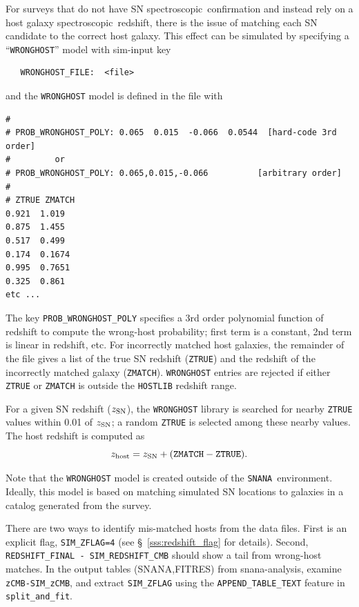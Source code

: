 \documentclass[12pt]{article}
\newcommand{\snana}{{\tt SNANA}}
\newcommand{\spec}{spectroscopic}
\begin{document}
{For surveys that do not have SN \spec\ confirmation and instead
rely on a host galaxy \spec\ redshift, there is the issue of
matching each SN candidate to the correct host galaxy. 
This effect can be simulated by specifying a ``{\tt WRONGHOST}'' 
model with sim-input key 
%
\begin{verbatim}
   WRONGHOST_FILE:  <file> 
\end{verbatim}
%
and the {\tt WRONGHOST}  model is defined in the file with
%
\begin{Verbatim}[frame=single]
#
# PROB_WRONGHOST_POLY: 0.065  0.015  -0.066  0.0544  [hard-code 3rd order]
#         or
# PROB_WRONGHOST_POLY: 0.065,0.015,-0.066          [arbitrary order]
#
# ZTRUE ZMATCH 
0.921  1.019
0.875  1.455
0.517  0.499
0.174  0.1674
0.995  0.7651
0.325  0.861 
etc ...
\end{Verbatim}
%
The key {\tt PROB\_WRONGHOST\_POLY} specifies a 3rd order
polynomial function of redshift to compute the wrong-host
probability; first term is a constant, 2nd term is linear in redshift, etc.
For incorrectly matched host galaxies, the remainder of the file 
gives a list of the true SN redshift
({\tt ZTRUE}) and the redshift of the incorrectly matched
galaxy ({\tt ZMATCH}).
{\tt WRONGHOST} entries are rejected if either {\tt ZTRUE}
or {\tt ZMATCH} is outside the {\tt HOSTLIB} redshift range.

\newcommand{\zSN}{z_{\rm SN}}
\newcommand{\zHOST}{z_{\rm host}}
For a given SN redshift ($\zSN$), the {\tt WRONGHOST} library is 
searched for nearby {\tt ZTRUE} values within 0.01 of $\zSN$;
a random {\tt ZTRUE} is selected among these nearby values.
The host redshift is computed as
  $$ \zHOST = \zSN + ({\rm\tt ZMATCH - ZTRUE}). $$


Note that the {\tt WRONGHOST} model is created outside
of the \snana\ environment. 
Ideally, this model is based on matching simulated SN 
locations to galaxies in a catalog generated from the survey.


\medskip
There are two ways to identify mis-matched hosts from the data files.
First is an explicit flag, {\tt SIM\_ZFLAG=4} 
(see \S~\ref{sss:redshift_flag} for details).
Second, {\tt REDSHIFT\_FINAL - SIM\_REDSHIFT\_CMB} should 
show a tail from wrong-host matches.
In the output tables (SNANA,FITRES) from snana-analysis,
examine {\tt zCMB-SIM\_zCMB}, and extract {\tt SIM\_ZFLAG}
using the {\tt APPEND\_TABLE\_TEXT} feature in {\tt split\_and\_fit}.


   \clearpage
   \newcommand{\groupid}{{\tt GROUPID}}
}
\end{document}
